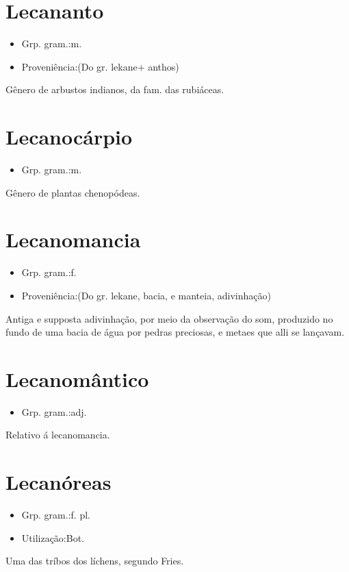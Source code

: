 \section{Lecananto}
\begin{itemize}
\item {Grp. gram.:m.}
\end{itemize}
\begin{itemize}
\item {Proveniência:(Do gr. \textunderscore lekane\textunderscore  + \textunderscore anthos\textunderscore )}
\end{itemize}
Gênero de arbustos indianos, da fam. das rubiáceas.
\section{Lecanocárpio}
\begin{itemize}
\item {Grp. gram.:m.}
\end{itemize}
Gênero de plantas chenopódeas.
\section{Lecanomancia}
\begin{itemize}
\item {Grp. gram.:f.}
\end{itemize}
\begin{itemize}
\item {Proveniência:(Do gr. \textunderscore lekane\textunderscore , bacia, e \textunderscore manteia\textunderscore , adivinhação)}
\end{itemize}
Antiga e supposta adivinhação, por meio da observação do som, produzido no fundo de uma bacia de água por pedras preciosas, e metaes que alli se lançavam.
\section{Lecanomântico}
\begin{itemize}
\item {Grp. gram.:adj.}
\end{itemize}
Relativo á lecanomancia.
\section{Lecanóreas}
\begin{itemize}
\item {Grp. gram.:f. pl.}
\end{itemize}
\begin{itemize}
\item {Utilização:Bot.}
\end{itemize}
Uma das tríbos dos líchens, segundo Fries.
